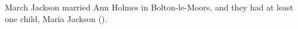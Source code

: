 
March Jackson married Ann Holmes in Bolton-le-Moors, and they had at least one child, Maria Jackson ().
